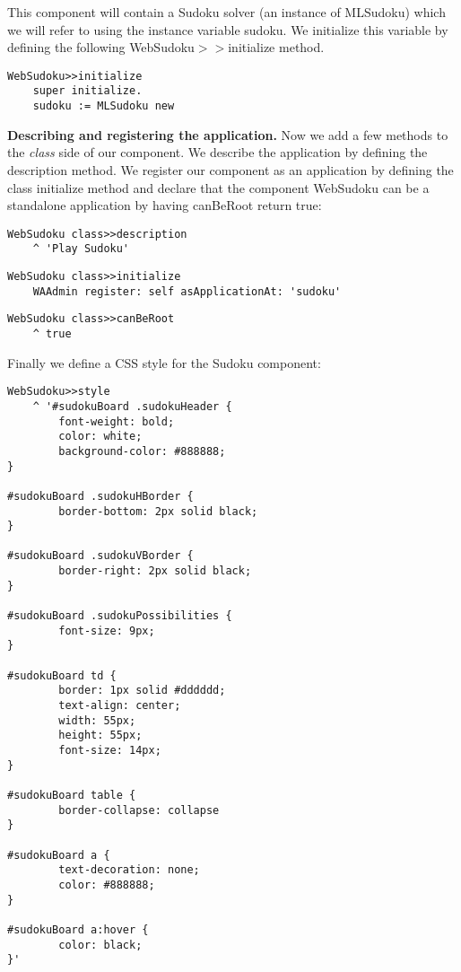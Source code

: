 \documentclass[a4paper,10pt,twoside]{book}
\newcommand{\ct}[1]{{\small\ttfamily\textup{#1}}}
\begin{document}
This component will contain a Sudoku solver (an instance of \ct{MLSudoku}) which we will refer to using the instance variable \ct{sudoku}. We initialize this variable by defining the following \ct{WebSudoku$>$$>$initialize} method.

\begin{lstlisting}
WebSudoku>>initialize
    super initialize.
    sudoku := MLSudoku new
\end{lstlisting}

\textbf{Describing and registering the application.} Now we add a few methods to the \textit{class} side of our component. We describe the application by defining the \ct{description} method. We register our component as an application by defining the class \ct{initialize} method and declare that the component  \ct{WebSudoku} can be a standalone application by having \ct{canBeRoot} return true:

\begin{lstlisting}
WebSudoku class>>description
    ^ 'Play Sudoku'
\end{lstlisting}

\begin{lstlisting}
WebSudoku class>>initialize
    WAAdmin register: self asApplicationAt: 'sudoku'
\end{lstlisting}

\begin{lstlisting}
WebSudoku class>>canBeRoot
    ^ true
\end{lstlisting}

Finally we define a CSS style for the Sudoku component:

\begin{lstlisting}
WebSudoku>>style
    ^ '#sudokuBoard .sudokuHeader {
        font-weight: bold;
        color: white;
        background-color: #888888;
}

#sudokuBoard .sudokuHBorder {
        border-bottom: 2px solid black;
}

#sudokuBoard .sudokuVBorder {
        border-right: 2px solid black;
}

#sudokuBoard .sudokuPossibilities {
        font-size: 9px;
}

#sudokuBoard td {
        border: 1px solid #dddddd;
        text-align: center;
        width: 55px;
        height: 55px;
        font-size: 14px;
}

#sudokuBoard table {
        border-collapse: collapse
}

#sudokuBoard a {
        text-decoration: none;
        color: #888888;
}

#sudokuBoard a:hover {
        color: black;
}'
\end{lstlisting}
\end{document}
